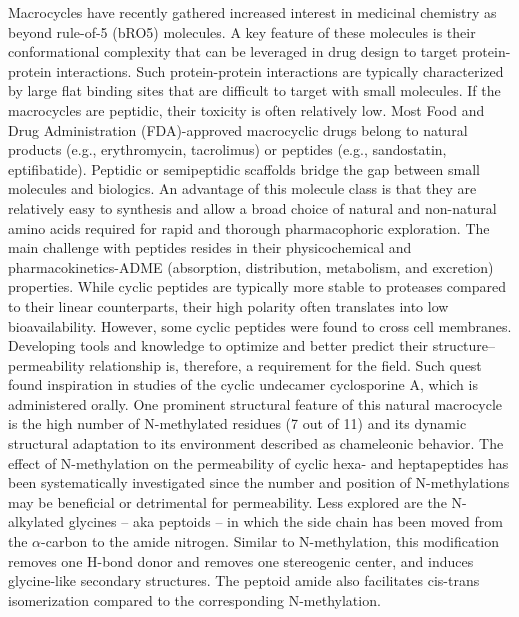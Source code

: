 Macrocycles have recently gathered increased interest in medicinal chemistry as beyond rule-of-5 (bRO5) molecules. \cite{Driggers2008, Mallinson2012, Doak2014, Dougherty2017, Marsault2011, Abdalla2018, Marsault2017, Caron2021}
A key feature of these molecules is their conformational complexity that can be leveraged in drug design to target protein-protein interactions. \cite{ Chène2006, Janin2008, Jones13, Scott2016, Modell2016}
Such protein-protein interactions are typically characterized by large flat binding sites that are difficult to target with small molecules. \cite{Doak2016}
If the macrocycles are peptidic, their toxicity is often relatively low. \cite{Zorzi2017}
Most Food and Drug Administration (FDA)-approved macrocyclic drugs belong to natural products (e.g., erythromycin, tacrolimus) or peptides (e.g., sandostatin, eptifibatide). \cite{Giordanetto2014}
Peptidic or semipeptidic scaffolds bridge the gap between small molecules and biologics. An advantage of this molecule class is that they are relatively easy to synthesis and allow a broad choice of natural and non-natural amino acids required for rapid and thorough pharmacophoric exploration. 
The main challenge with peptides resides in their physicochemical and pharmacokinetics-ADME (absorption, distribution, metabolism, and excretion) properties. 
While cyclic peptides are typically more stable to proteases compared to their linear counterparts, their high polarity often translates into low bioavailability.\cite{Naylor2017, Fosgerau2015}
However, some cyclic peptides were found to cross cell membranes.\cite{Naylor2017, Wang2014, Nielsen2014} 
Developing tools and knowledge to optimize and better predict their structure–permeability relationship is, therefore, a requirement for the field. Such quest found inspiration in studies of the cyclic undecamer cyclosporine A, which is administered orally. 
One prominent structural feature of this natural macrocycle is the high number of N-methylated residues (7 out of 11) and its dynamic structural adaptation to its environment described as chameleonic behavior. \cite{Whitty2016, Danelius2020, Witek2017}
The effect of N-methylation on the permeability of cyclic hexa- and heptapeptides has been systematically investigated since the number and position of N-methylations may be beneficial or detrimental for permeability. \cite{Nielsen2014, Räder2018, White2011, Beck2012, Biron2008, White2011} 
%
Less explored are the N-alkylated glycines -- aka peptoids -- in which the side chain has been moved from the $\alpha$-carbon to the amide nitrogen. \cite{Schwochert2015} 
Similar to N-methylation, this modification removes one H-bond donor and removes one stereogenic center, and induces glycine-like secondary structures.
The peptoid amide also facilitates cis-trans isomerization compared to the corresponding N-methylation.\cite{Sui2007} 



